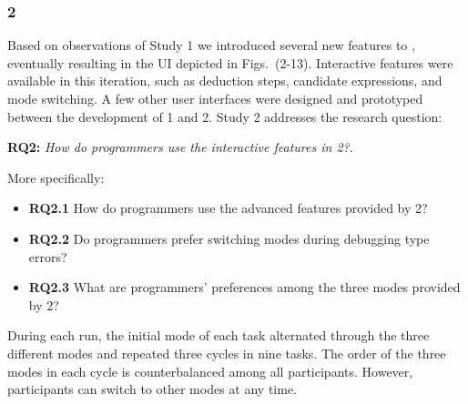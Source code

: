 



\subsubsection{\textbf{\chameleon{} 2}}  \label{sub:us4}
Based on observations of Study 1 we introduced several new features to \chameleon{}, eventually resulting in the UI depicted in Figs.~(2-13). Interactive features were available in this iteration, such as deduction steps, candidate expressions, and mode switching. A few other user interfaces \cite{Fu2021-xd} were designed and prototyped between the development of \chameleon{} 1 and \chameleon{} 2. Study 2 addresses the research question: 

\noindent\textbf{RQ2:} \textit{How do programmers use the interactive features in \chameleon{} 2?}. 

More specifically:
\begin{itemize}
    \item \textbf{RQ2.1} How do programmers use the advanced features provided by \chameleon{} 2?
    \item \textbf{RQ2.2} Do programmers prefer switching modes during debugging type errors?
    \item  \textbf{RQ2.3} What are programmers' preferences among the three modes provided by \chameleon{} 2?


\end{itemize}

During each run, the initial mode of each task alternated through the three different modes and repeated three cycles in nine tasks. The order of the three modes in each cycle is counterbalanced among all participants. However, participants can switch to other modes at any time. 




